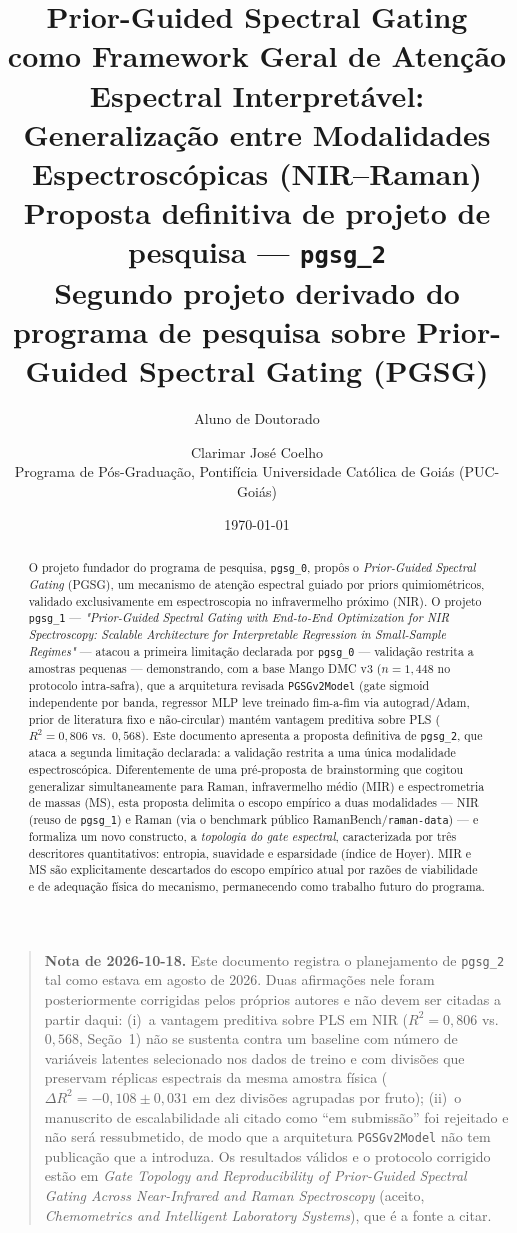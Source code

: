 \documentclass[11pt,a4paper]{article}
\title{\textbf{Prior-Guided Spectral Gating como Framework Geral de Atenção Espectral Interpretável:\\
Generalização entre Modalidades Espectroscópicas (NIR–Raman)}\\[0.3cm]
\large Proposta definitiva de projeto de pesquisa --- \texttt{pgsg\_2}\\
\normalsize Segundo projeto derivado do programa de pesquisa sobre Prior-Guided Spectral Gating (PGSG)}
\author{Aluno de Doutorado \and Clarimar José Coelho \\
\small Programa de Pós-Graduação, Pontifícia Universidade Católica de Goiás (PUC-Goiás)}
\date{\today}
\begin{document}
\maketitle

\begin{quote}
\small\textbf{Nota de 2026-10-18.} Este documento registra o planejamento de
\texttt{pgsg\_2} tal como estava em agosto de 2026. Duas afirmações nele
foram posteriormente corrigidas pelos próprios autores e não devem ser
citadas a partir daqui: (i)~a vantagem preditiva sobre PLS em NIR
($R^2=0{,}806$ vs.\ $0{,}568$, Seção~1) não se sustenta contra um baseline
com número de variáveis latentes selecionado nos dados de treino e com
divisões que preservam réplicas espectrais da mesma amostra física
($\Delta R^2 = -0{,}108 \pm 0{,}031$ em dez divisões agrupadas por fruto);
(ii)~o manuscrito de escalabilidade ali citado como ``em submissão'' foi
rejeitado e não será ressubmetido, de modo que a arquitetura
\texttt{PGSGv2Model} não tem publicação que a introduza. Os resultados
válidos e o protocolo corrigido estão em \emph{Gate Topology and
Reproducibility of Prior-Guided Spectral Gating Across Near-Infrared and
Raman Spectroscopy} (aceito, \emph{Chemometrics and Intelligent Laboratory
Systems}), que é a fonte a citar.
\end{quote}


\begin{abstract}
\noindent
O projeto fundador do programa de pesquisa, \texttt{pgsg\_0}, propôs o \emph{Prior-Guided Spectral Gating} (PGSG), um mecanismo de atenção espectral guiado por priors quimiométricos, validado exclusivamente em espectroscopia no infravermelho próximo (NIR). O projeto \texttt{pgsg\_1} --- \emph{"Prior-Guided Spectral Gating with End-to-End Optimization for NIR Spectroscopy: Scalable Architecture for Interpretable Regression in Small-Sample Regimes"} --- atacou a primeira limitação declarada por \texttt{pgsg\_0} --- validação restrita a amostras pequenas --- demonstrando, com a base Mango DMC v3 ($n=1{,}448$ no protocolo intra-safra), que a arquitetura revisada \texttt{PGSGv2Model} (gate sigmoid independente por banda, regressor MLP leve treinado fim-a-fim via autograd/Adam, prior de literatura fixo e não-circular) mantém vantagem preditiva sobre PLS ($R^2=0{,}806$ vs.\ $0{,}568$). Este documento apresenta a proposta definitiva de \texttt{pgsg\_2}, que ataca a segunda limitação declarada: a validação restrita a uma única modalidade espectroscópica. Diferentemente de uma pré-proposta de brainstorming que cogitou generalizar simultaneamente para Raman, infravermelho médio (MIR) e espectrometria de massas (MS), esta proposta delimita o escopo empírico a duas modalidades --- NIR (reuso de \texttt{pgsg\_1}) e Raman (via o benchmark público RamanBench/\texttt{raman-data}) --- e formaliza um novo constructo, a \emph{topologia do gate espectral}, caracterizada por três descritores quantitativos: entropia, suavidade e esparsidade (índice de Hoyer). MIR e MS são explicitamente descartados do escopo empírico atual por razões de viabilidade e de adequação física do mecanismo, permanecendo como trabalho futuro do programa.
\end{abstract}
\end{document}
